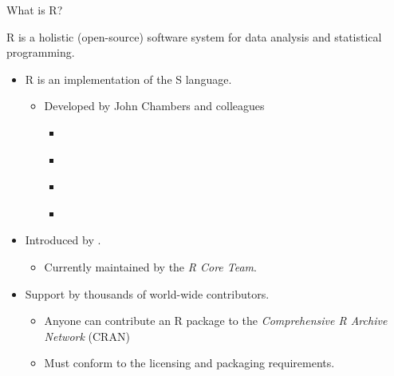 \documentclass[10pt]{beamer}
\begin{document}
\begin{frame}{What is R?}
  
  R is a holistic (open-source) software system for data analysis and
  statistical programming.
  \vc
  \begin{itemize}
  \item R is an implementation of the S language.
    \begin{itemize}
    \item Developed by John Chambers and colleagues 
      \begin{itemize}
      \item \citet{beckerChambers:1984}
      \item \citet{beckerEtAl:1988}
      \item \citet{chambersHastie:1992}
      \item \citet{chambers:1998}
      \end{itemize}
    \end{itemize}
    \vc
  \item Introduced by \citet{ihakaGentleman:1996}.
    \begin{itemize}
    \item Currently maintained by the \emph{R Core Team}.
    \end{itemize}
    \vc
  \item Support by thousands of world-wide contributors.  
    \begin{itemize}
    \item Anyone can contribute an R package to the \emph{Comprehensive R 
        Archive Network} (CRAN) 
    \item Must conform to the licensing and packaging requirements.
    \end{itemize}
  \end{itemize}
  
\end{frame}

\end{document}
